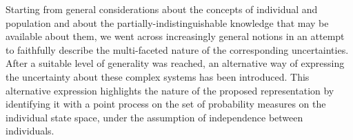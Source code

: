 \documentclass{aptpub}
\numberwithin{equation}{section}
\begin{document}
Starting from general considerations about the concepts of individual and population and about the partially-indistinguishable knowledge that may be available about them, we went across increasingly general notions in an attempt to faithfully describe the multi-faceted nature of the corresponding uncertainties. After a suitable level of generality was reached, an alternative way of expressing the uncertainty about these complex systems has been introduced. This alternative expression highlights the nature of the proposed representation by identifying it with a point process on the set of probability measures on the individual state space, under the assumption of independence between individuals.


\end{document}
